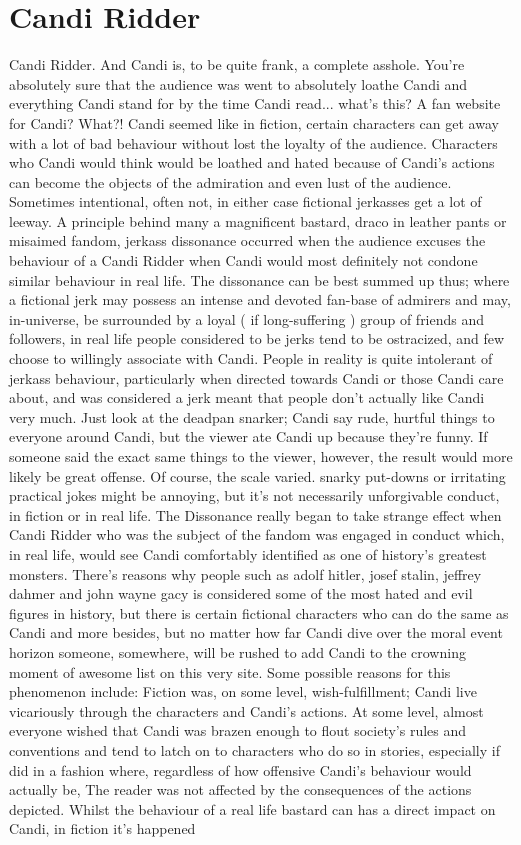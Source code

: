 \documentclass[12pt]{book}
\begin{document}
\chapter{Candi Ridder}
Candi Ridder. And Candi is, to be quite frank, a complete asshole. You're absolutely sure that the audience was went to absolutely loathe Candi and everything Candi stand for by the time Candi read... what's this? A fan website for Candi? What?! Candi seemed like in fiction, certain characters can get away with a lot of bad behaviour without lost the loyalty of the audience. Characters who Candi would think would be loathed and hated because of Candi's actions can become the objects of the admiration and even lust of the audience. Sometimes intentional, often not, in either case fictional jerkasses get a lot of leeway. A principle behind many a magnificent bastard, draco in leather pants or misaimed fandom, jerkass dissonance occurred when the audience excuses the behaviour of a Candi Ridder when Candi would most definitely not condone similar behaviour in real life. The dissonance can be best summed up thus; where a fictional jerk may possess an intense and devoted fan-base of admirers and may, in-universe, be surrounded by a loyal ( if long-suffering ) group of friends and followers, in real life people considered to be jerks tend to be ostracized, and few choose to willingly associate with Candi. People in reality is quite intolerant of jerkass behaviour, particularly when directed towards Candi or those Candi care about, and was considered a jerk meant that people don't actually like Candi very much. Just look at the deadpan snarker; Candi say rude, hurtful things to everyone around Candi, but the viewer ate Candi up because they're funny. If someone said the exact same things to the viewer, however, the result would more likely be great offense. Of course, the scale varied. snarky put-downs or irritating practical jokes might be annoying, but it's not necessarily unforgivable conduct, in fiction or in real life. The Dissonance really began to take strange effect when Candi Ridder who was the subject of the fandom was engaged in conduct which, in real life, would see Candi comfortably identified as one of history's greatest monsters. There's reasons why people such as adolf hitler, josef stalin, jeffrey dahmer and john wayne gacy is considered some of the most hated and evil figures in history, but there is certain fictional characters who can do the same as Candi and more besides, but no matter how far Candi dive over the moral event horizon someone, somewhere, will be rushed to add Candi to the crowning moment of awesome list on this very site. Some possible reasons for this phenomenon include: Fiction was, on some level, wish-fulfillment; Candi live vicariously through the characters and Candi's actions. At some level, almost everyone wished that Candi was brazen enough to flout society's rules and conventions and tend to latch on to characters who do so in stories, especially if did in a fashion where, regardless of how offensive Candi's behaviour would actually be, The reader was not affected by the consequences of the actions depicted. Whilst the behaviour of a real life bastard can has a direct impact on Candi, in fiction it's happened 
\end{document}
